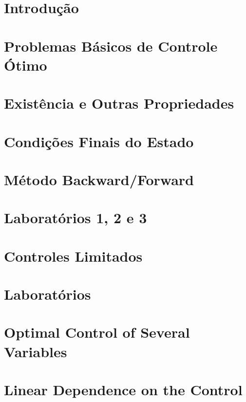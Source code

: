 \documentclass[a4paper, 11pt, oneside]{book}
\theoremstyle{definition}
\begin{document}


\tableofcontents

\chapter{Introdução}
\label{ch:intro}


\chapter{Problemas Básicos de Controle Ótimo}
\label{ch:1}


\chapter{Existência e Outras Propriedades}
\label{ch:2}


\chapter{Condições Finais do Estado}
\label{ch:3}


\chapter{Método Backward/Forward}
\label{ch:4}


\chapter{Laboratórios 1, 2 e 3}
\label{labs123}


\chapter{Controles Limitados}
\label{ch:8}


\chapter{Laboratórios}


\chapter{Optimal Control of Several Variables}


\chapter{Linear Dependence on the Control}



\end{document}
